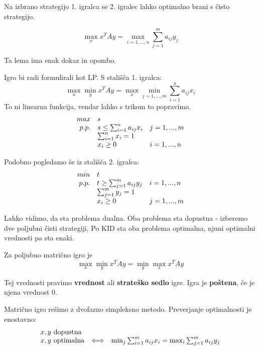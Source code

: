 \documentclass[11pt, a4paper]{article}
\begin{document}
    \begin{remark}
        Na izbrano strategijo 1. igralca se 2. igralec lahko optimalno brani s čisto strategijo.
    \end{remark}

    \begin{lemma}
        \[
            \max_x x^T A y = \max_{i=1,...,n} \sum_{j=1}^m a_{ij} y_j
        \]
    \end{lemma}

    Ta lema ima enak dokaz in opombo.
    \par
    Igro bi radi formulirali kot LP. S stališča 1. igralca:
    \[
        \max_x \min_y x^T A y = \max_x \min_{j=1,...,m} \sum_{i=1}^n a_{ij} x_i    
    \]
    To ni linearna funkcija, vendar lahko s trikom to popravimo.
    \[
        \begin{array}{r l l}
            max & s \\
            p.p. & s \le \sum_{i=1}^n a_{ij} x_i & j=1,...,m \\
            & \sum_{i=1}^n x_i = 1 \\
            & x_i \ge 0 & i=1,...,n
        \end{array}  
    \]

    Podobno pogledamo še iz stališča 2. igralca:
    \[
        \begin{array}{r l l}
            min & t \\
            p.p. & t \ge \sum_{j=1}^m a_{ij} y_j & i=1,...,n \\
            & \sum_{j=1}^m y_j = 1 \\
            & x_i \ge 0 & j=1,...,m
        \end{array}  
    \]

    Lahko vidimo, da sta problema dualna. Oba problema sta dopustna - izberemo dve poljubni čisti strategiji. Po KID sta oba problema optimalna, njuni optimalni vrednosti pa sta enaki.

    \begin{theorem}
        Za poljubno matrično igro je
        \[
            \max_x \min_y x^T A y = \min_y \max_x x^T A y    
        \]
    \end{theorem}
    Tej vrednosti pravimo \textbf{vrednost} ali \textbf{strateško sedlo} igre. Igra je \textbf{poštena}, če je njena vrednost 0.

    \par
    Matrično igro rešimo z dvofazno simpleksno metodo. Preverjanje optimalnosti je enostavno:
    \[
        \begin{array}{l c l}
            x,y\ \text{dopustna} \\
            x,y\ \text{optimalna} & \Longleftrightarrow & \min_j \sum_{i=1}^m a_{ij} x_i = \max_i \sum_{j=1}^m a_{ij} y_j
        \end{array}    
    \]
\end{document}
